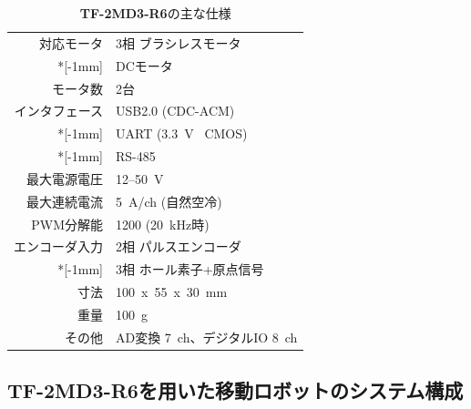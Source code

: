 \documentclass[11pt,a4j,openany,fleqn]{jbook}
\begin{document}
\begin{table}[H]
\caption{{\bf TF-2MD3-R6}の主な仕様}
\label{tb:tfrog_motor_driver}
\smallskip
\centering\begin{tabular}{rl}
\toprule
対応モータ			&	3相 ブラシレスモータ			\\*[-1mm]
					&	DCモータ						\\
モータ数			&	2台								\\
インタフェース		&	USB2.0 (CDC-ACM)				\\*[-1mm]
					&	UART (3.3~V \ CMOS)				\\*[-1mm]
					&	RS-485							\\
最大電源電圧		&	12--50~V						\\
最大連続電流		&	5~A/ch (自然空冷)				\\
PWM分解能			&	1200 (20~kHz時)					\\
エンコーダ入力		&	2相 パルスエンコーダ			\\*[-1mm]
					&	3相 ホール素子+原点信号			\\
寸法				&	100~x~55~x~30~mm				\\
重量				&	100~g							\\
その他				&	AD変換 7~ch、デジタルIO 8~ch	\\
\bottomrule
\end{tabular}
\end{table}


\newpage
\subsection{{\bf TF-2MD3-R6}を用いた移動ロボットのシステム構成}
\label{sec:システム構成}
\end{document}
